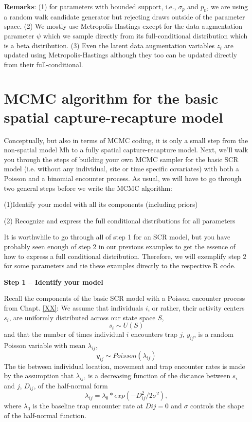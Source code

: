 {\bf Remarks}: (1) for parameters with bounded support, i.e.,
$\sigma_{p}$ and $p_{0}$, we are using a random walk candidate
generator but rejecting draws outside of the parameter space.  (2) We
mostly use Metropolis-Hastings except for the data augmentation
parameter $\psi$ which we sample directly from its full-conditional
distribution which is a beta distribution.  (3) Even the latent data
augmentation variables $z_{i}$ are updated using Metropolis-Hastings
although they too can be updated directly from their full-conditional.

\section{MCMC algorithm for the basic spatial capture-recapture model}

Conceptually, but also in terms of MCMC coding, it is only a small step from the non-spatial model Mh to a fully spatial capture-recapture model. Next, we'll walk you through the steps of building your own MCMC sampler for the basic SCR model (i.e. without any individual, site or time specific covariates) with both a Poisson and a binomial encounter process.
As usual, we will have to go through two general steps before we write the MCMC algorithm:

(1)Identify your model with all its components (including
    priors)

(2) Recognize and express the full conditional distributions for
    all parameters

It is worthwhile to go through all of step 1 for an SCR model, but you
have probably seen enough of step 2 in our previous examples to get
the essence of how to express a full conditional
distribution. Therefore, we will exemplify step 2 for some parameters
and tie these examples directly to the respective R code.


{\bf Step 1 -- Identify your model}

Recall the components of the basic SCR model with a Poisson encounter process from Chapt. \ref{XX}:
We assume that individuals $i$, or rather, their activity centers $s_i$, are uniformly distributed across our state space $S$,
\[
s_i  \sim U(S)
\]
and that the number of times individual $i$ encounters trap $j$, $y_{ij}$, is a random Poisson variable with mean $\lambda_{ij}$,
\[
y_{ij} \sim Poisson(\lambda_{ij})
\]
The tie between individual location, movement and trap encounter rates is made by the assumption that $\lambda_{ij}$, is a decreasing function of the distance between $s_i$ and $j$, $D_{ij}$, of the half-normal form
\[
\lambda_{ij} =  \lambda_0 * exp(-D_{ij}^2/2\sigma^2),
\]
where $\lambda_0$ is the baseline trap encounter rate at $Dij=0$ and $\sigma$ controls the shape of the half-normal function.

